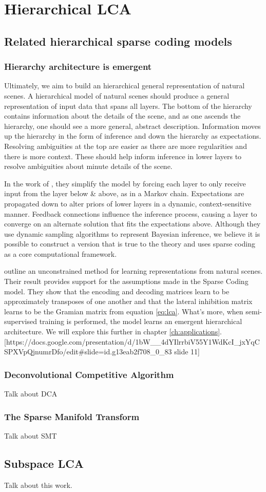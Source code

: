 \chapter{Hierarchical LCA}

\section{Related hierarchical sparse coding models}


\subsection{Hierarchy architecture is emergent}

Ultimately, we aim to build an hierarchical general representation of natural scenes. A hierarchical model of natural scenes should produce a general representation of input data that spans all layers. The bottom of the hierarchy contains information about the details of the scene, and as one ascends the hierarchy, one should see a more general, abstract description. Information moves up the hierarchy in the form of inference and down the hierarchy as expectations. Resolving ambiguities at the top are easier as there are more regularities and there is more context. These should help inform inference in lower layers to resolve ambiguities about minute details of the scene.

In the work of \citet{lee2003hierarchical}, they simplify the model by forcing each layer to only receive input from the layer below & above, as in a Markov chain. Expectations are propagated down to alter priors of lower layers in a dynamic, context-sensitive manner. Feedback connections influence the inference process, causing a layer to converge on an alternate solution that fits the expectations above. Although they use dynamic sampling algorithms to represent Bayesian inference, we believe it is possible to construct a version that is true to the theory and uses sparse coding as a core computational framework.

\citet{rolfe2013discriminative} outline an unconstrained method for learning representations from natural scenes. Their result provides support for the assumptions made in the Sparse Coding model. They show that the encoding and decoding matrices learn to be approximately transposes of one another and that the lateral inhibition matrix learns to be the Gramian matrix from equation \ref{eq:lca}. What's more, when semi-supervised training is performed, the model learns an emergent hierarchical architecture. We will explore this further in chapter \ref{ch:applications}.
[https://docs.google.com/presentation/d/1bW__4dYIlrrbiV55Y1WdKcI_jxYqCSPXVpQjnumrDfo/edit#slide=id.g13eab2f708_0_83 slide 11]


\subsection{Deconvolutional Competitive Algorithm}
Talk about DCA


\subsection{The Sparse Manifold Transform}
Talk about SMT


\section{Subspace LCA}
Talk about this work.